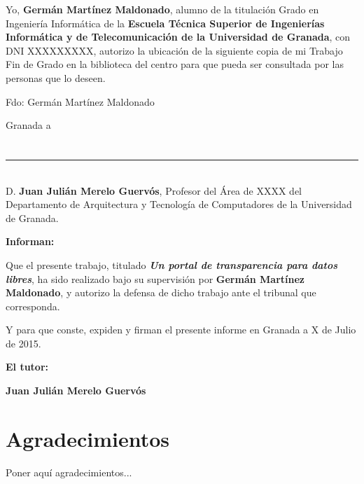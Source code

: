 Yo, \textbf{Germán Martínez Maldonado}, alumno de la titulación Grado en Ingeniería Informática de la \textbf{Escuela Técnica Superior
de Ingenierías Informática y de Telecomunicación de la Universidad de Granada}, con DNI XXXXXXXXX, autorizo la
ubicación de la siguiente copia de mi Trabajo Fin de Grado en la biblioteca del centro para que pueda ser
consultada por las personas que lo deseen.

\vspace{6cm}

\noindent Fdo: Germán Martínez Maldonado

\vspace{2cm}

\begin{flushright}
Granada a 
\end{flushright}


\chapter*{}
\thispagestyle{empty}

\noindent\rule[-1ex]{\textwidth}{2pt}\\[4.5ex]

D. \textbf{Juan Julián Merelo Guervós}, Profesor del Área de XXXX del Departamento de Arquitectura y Tecnología de Computadores de la Universidad de Granada.

\vspace{0.5cm}


\vspace{0.5cm}

\textbf{Informan:}

\vspace{0.5cm}

Que el presente trabajo, titulado \textit{\textbf{Un portal de transparencia para datos libres}},
ha sido realizado bajo su supervisión por \textbf{Germán Martínez Maldonado}, y autorizo la defensa de dicho trabajo ante el tribunal
que corresponda.

\vspace{0.5cm}

Y para que conste, expiden y firman el presente informe en Granada a X de Julio de 2015.

\vspace{1cm}

\textbf{El tutor:}

\vspace{5cm}

\noindent \textbf{Juan Julián Merelo Guervós}

\chapter*{Agradecimientos}
\thispagestyle{empty}

       \vspace{1cm}


Poner aquí agradecimientos...

